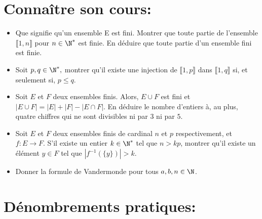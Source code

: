 \documentclass[a4paper,11pt]{article}
\theoremstyle{definition}
\begin{document}
 


 
 


\noindent{}

\smallskip
\section*{Connaître son cours:}
\begin{itemize}[$\bullet$]
	\item Que signifie qu'un ensemble E est fini. Montrer que toute partie de l'ensemble $\llbracket1,n\rrbracket$ pour $n\in\N^*$ est finie. En déduire que toute partie d’un ensemble fini est finie.
	\item Soit $p , q \in \N^*,$ montrer qu'il existe une injection de $\llbracket1,p\rrbracket$ dans $\llbracket1,q\rrbracket$ si, et seulement si, $p \leq q $.
	\item Soit $E$ et $F$ deux ensembles finis. Alors, $E \cup F$ est fini et $\displaystyle |E \cup F | = |E | + |F | - |E \cap F |$. En déduire le nombre d'entiers à, au plus, quatre chiffres qui ne sont divisibles ni par $3$ ni par $5$.
	\item Soit $E$ et $F$ deux ensembles finis de cardinal $n$ et $p$ respectivement, et $f : E \to F $. S'il existe un entier $k \in \N^*$ tel que $n > k p $, montrer qu'il existe un élément $y \in F$ tel que $| f^{-1}(\{y \})| > k $.
	\item Donner la formule de Vandermonde pour tous $a , b , n \in \N$.

\end{itemize}
\raggedright

\section*{Dénombrements pratiques:}\hfill\\%
\end{document}
